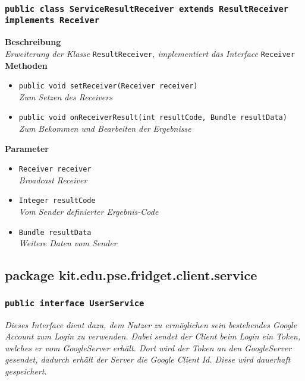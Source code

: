 \subsubsection{\texttt{public class ServiceResultReceiver extends ResultReceiver implements Receiver}}

	\textbf{Beschreibung} \\
	\textit{Erweiterung der Klasse} \texttt{ResultReceiver}\textit{, implementiert das Interface} \texttt{Receiver}\\

	\textbf{Methoden}
	\begin{itemize}
		\item\texttt{{public void setReceiver(Receiver receiver)}}\\
	\textit{Zum Setzen des Receivers}\\
	\item\texttt{{public void onReceiverResult(int resultCode, Bundle resultData)}}\\
	\textit{Zum Bekommen und Bearbeiten der Ergebnisse}\\
	\end{itemize}

	\textbf{Parameter}
	\begin{itemize}
		\item\texttt{Receiver receiver}\\ 
	\textit{Broadcast Receiver}\\
			\item\texttt{Integer resultCode}\\ 
	\textit{Vom Sender definierter Ergebnis-Code}\\
	\item\texttt{Bundle resultData}\\ 
	\textit{Weitere Daten vom Sender }\\
	\end{itemize}

\newpage


	\subsection{package kit.edu.pse.fridget.client.service}
	\subsubsection{\texttt{public interface UserService}}
\textit{Dieses Interface dient dazu, dem Nutzer zu ermöglichen sein bestehendes Google Account zum Login zu verwenden. Dabei sendet der Client beim Login ein Token, welches er vom GoogleServer erhält. Dort wird der Token an den GoogleServer gesendet, dadurch erhält der Server die Google Client Id. Diese wird dauerhaft gespeichert.}\\

